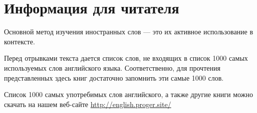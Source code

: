 \documentclass[a4paper,oneside,12pt]{amsart}
\begin{document}
\vspace{15mm}

\section{Информация для читателя}
\vspace{4mm}

Основной метод изучения иностранных слов --- это их активное использование в контексте.

Перед отрывками текста дается список слов, не входящих в список 1000 самых используемых слов английского языка. Соответственно, для прочтения представленных здесь книг достаточно запомнить эти самые 1000 слов.

\vspace{4mm}
{ \large
Список 1000 самых употребимых слов английского, а также другие книги можно скачать на нашем веб-сайте \url{http://english.proger.site/}
}
\end{document}
